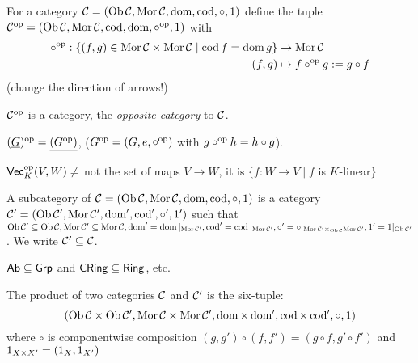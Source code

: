 \documentclass[a4paper]{report}
\begin{document}
\begin{defi}
For a category $\C = (\Ob \C, \Mor \C, \dom, \cod, \circ, 1)$ define the tuple $\C\op = (\Ob \C, \Mor \C, \cod, \dom, \circ\op, 1)$ with \begin{align*}
  \circ\op : \{(f,g) \in \Mor \C \tm \Mor \C \mid \cod f = \dom g\} &\to \Mor \C \\
  (f,g) &\mps f \circ\op g := g \circ f
\end{align*}(change the direction of arrows!)
\end{defi}

\begin{prop}[Exercise]
$\C \op$ is a category, the \emph{opposite category} to $\C$.
\end{prop}

\begin{exmp*}
$(\underline G){\op} = \underline{(G\op)}$, ($G\op = (G, e, \circ\op)$ with $g \circ\op h = h \circ g$).
\end{exmp*}

\begin{warn}
$\Vec_{K}\op(V,W) \ne$ not the set of maps $V \to W$, it is $\{f: W \to V \mid f $ is $K$-linear$\}$
\end{warn}

\begin{defi}
A subcategory of $\C = (\Ob \C, \Mor \C, \dom, \cod, \circ, 1)$ is a category $\C' = (\Ob \C', \Mor \C', \dom', \cod', \circ', 1')$ such that $\Ob \C' \subseteq \Ob \C, \Mor \C' \subseteq \Mor \C, \dom ' = \dom|_{\Mor \C'}, \cod ' = \cod|_{\Mor \C'}, \circ' = \circ|_{\Mor \C ' \tm_{\Ob \C} \Mor \C '}, 1' = 1|_{\Ob \C '}$. We write $\C' \subseteq \C$.
\end{defi}
\begin{exmp*}
$\Ab \subseteq \Grp$ and $\CRing \subseteq \Ring$, etc.
\end{exmp*}

\begin{defi} The product of two categories $\C$ and $\C'$ is the six-tuple: \[(\Ob \C \tm \Ob \C', \Mor \C \tm \Mor \C', \dom \tm \dom ', \cod \tm \cod', \circ, 1)\] where $\circ$ is componentwise composition $(g, g') \circ (f, f') = (g \circ f, g' \circ f')$ and $1_{X \tm X'} = (1_{X}, 1_{X'})$

\end{defi}
\end{document}
